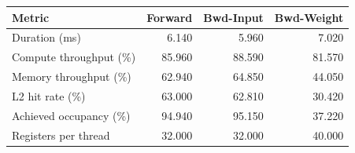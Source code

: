 \begin{tabular}{lrrr}
\toprule
Metric & Forward & Bwd-Input & Bwd-Weight \\
\midrule
Duration (ms) & 6.140 & 5.960 & 7.020 \\
Compute throughput (\%) & 85.960 & 88.590 & 81.570 \\
Memory throughput (\%) & 62.940 & 64.850 & 44.050 \\
L2 hit rate (\%) & 63.000 & 62.810 & 30.420 \\
Achieved occupancy (\%) & 94.940 & 95.150 & 37.220 \\
Registers per thread & 32.000 & 32.000 & 40.000 \\
\bottomrule
\end{tabular}
